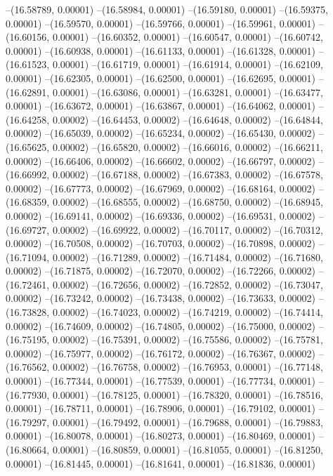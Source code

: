 --(16.58789, 0.00001)
--(16.58984, 0.00001)
--(16.59180, 0.00001)
--(16.59375, 0.00001)
--(16.59570, 0.00001)
--(16.59766, 0.00001)
--(16.59961, 0.00001)
--(16.60156, 0.00001)
--(16.60352, 0.00001)
--(16.60547, 0.00001)
--(16.60742, 0.00001)
--(16.60938, 0.00001)
--(16.61133, 0.00001)
--(16.61328, 0.00001)
--(16.61523, 0.00001)
--(16.61719, 0.00001)
--(16.61914, 0.00001)
--(16.62109, 0.00001)
--(16.62305, 0.00001)
--(16.62500, 0.00001)
--(16.62695, 0.00001)
--(16.62891, 0.00001)
--(16.63086, 0.00001)
--(16.63281, 0.00001)
--(16.63477, 0.00001)
--(16.63672, 0.00001)
--(16.63867, 0.00001)
--(16.64062, 0.00001)
--(16.64258, 0.00002)
--(16.64453, 0.00002)
--(16.64648, 0.00002)
--(16.64844, 0.00002)
--(16.65039, 0.00002)
--(16.65234, 0.00002)
--(16.65430, 0.00002)
--(16.65625, 0.00002)
--(16.65820, 0.00002)
--(16.66016, 0.00002)
--(16.66211, 0.00002)
--(16.66406, 0.00002)
--(16.66602, 0.00002)
--(16.66797, 0.00002)
--(16.66992, 0.00002)
--(16.67188, 0.00002)
--(16.67383, 0.00002)
--(16.67578, 0.00002)
--(16.67773, 0.00002)
--(16.67969, 0.00002)
--(16.68164, 0.00002)
--(16.68359, 0.00002)
--(16.68555, 0.00002)
--(16.68750, 0.00002)
--(16.68945, 0.00002)
--(16.69141, 0.00002)
--(16.69336, 0.00002)
--(16.69531, 0.00002)
--(16.69727, 0.00002)
--(16.69922, 0.00002)
--(16.70117, 0.00002)
--(16.70312, 0.00002)
--(16.70508, 0.00002)
--(16.70703, 0.00002)
--(16.70898, 0.00002)
--(16.71094, 0.00002)
--(16.71289, 0.00002)
--(16.71484, 0.00002)
--(16.71680, 0.00002)
--(16.71875, 0.00002)
--(16.72070, 0.00002)
--(16.72266, 0.00002)
--(16.72461, 0.00002)
--(16.72656, 0.00002)
--(16.72852, 0.00002)
--(16.73047, 0.00002)
--(16.73242, 0.00002)
--(16.73438, 0.00002)
--(16.73633, 0.00002)
--(16.73828, 0.00002)
--(16.74023, 0.00002)
--(16.74219, 0.00002)
--(16.74414, 0.00002)
--(16.74609, 0.00002)
--(16.74805, 0.00002)
--(16.75000, 0.00002)
--(16.75195, 0.00002)
--(16.75391, 0.00002)
--(16.75586, 0.00002)
--(16.75781, 0.00002)
--(16.75977, 0.00002)
--(16.76172, 0.00002)
--(16.76367, 0.00002)
--(16.76562, 0.00002)
--(16.76758, 0.00002)
--(16.76953, 0.00001)
--(16.77148, 0.00001)
--(16.77344, 0.00001)
--(16.77539, 0.00001)
--(16.77734, 0.00001)
--(16.77930, 0.00001)
--(16.78125, 0.00001)
--(16.78320, 0.00001)
--(16.78516, 0.00001)
--(16.78711, 0.00001)
--(16.78906, 0.00001)
--(16.79102, 0.00001)
--(16.79297, 0.00001)
--(16.79492, 0.00001)
--(16.79688, 0.00001)
--(16.79883, 0.00001)
--(16.80078, 0.00001)
--(16.80273, 0.00001)
--(16.80469, 0.00001)
--(16.80664, 0.00001)
--(16.80859, 0.00001)
--(16.81055, 0.00001)
--(16.81250, 0.00001)
--(16.81445, 0.00001)
--(16.81641, 0.00001)
--(16.81836, 0.00001)
